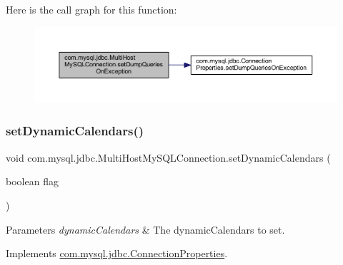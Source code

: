 Here is the call graph for this function\+:
\nopagebreak
\begin{figure}[H]
\begin{center}
\leavevmode
\includegraphics[width=350pt]{classcom_1_1mysql_1_1jdbc_1_1_multi_host_my_s_q_l_connection_ad62d20e58b21ef53f69e1c7c39325ef8_cgraph}
\end{center}
\end{figure}
\mbox{\label{classcom_1_1mysql_1_1jdbc_1_1_multi_host_my_s_q_l_connection_affcca6d6db55ca52fb6b29fdba761ca8}} 
\subsubsection{\texorpdfstring{set\+Dynamic\+Calendars()}{setDynamicCalendars()}}
{\footnotesize\ttfamily void com.\+mysql.\+jdbc.\+Multi\+Host\+My\+S\+Q\+L\+Connection.\+set\+Dynamic\+Calendars (\begin{DoxyParamCaption}\item[{boolean}]{flag }\end{DoxyParamCaption})}


\begin{DoxyParams}{Parameters}
{\em dynamic\+Calendars} & The dynamic\+Calendars to set. \\
\hline
\end{DoxyParams}


Implements \mbox{\hyperlink{interfacecom_1_1mysql_1_1jdbc_1_1_connection_properties_a01fd5822e9a8d49fb51172c50e3d0d31}{com.\+mysql.\+jdbc.\+Connection\+Properties}}.

